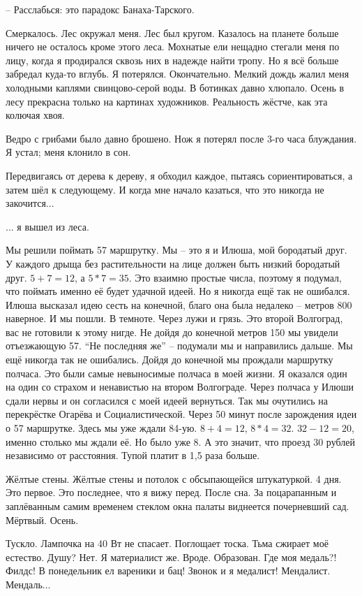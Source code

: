 -- Расслабься: это парадокс Банаха-Тарского.

\asterisks
Смеркалось. Лес окружал меня. Лес был кругом. Казалось на планете больше ничего не осталось кроме этого леса. Мохнатые ели нещадно стегали меня по лицу, когда я продирался сквозь них в надежде найти тропу. Но я всё больше забредал куда-то вглубь. Я потерялся. Окончательно. Мелкий дождь жалил меня холодными каплями свинцово-серой воды. В ботинках давно хлюпало. Осень в лесу прекрасна только на картинах художников. Реальность жёстче, как эта колючая хвоя.

Ведро с грибами было давно брошено. Нож я потерял после 3-го часа блуждания. Я устал; меня клонило в сон.

Передвигаясь от дерева к дереву, я обходил каждое, пытаясь сориентироваться, а затем шёл к следующему. И когда мне начало казаться, что это никогда не закочится...

... я вышел из леса.

\asterisks
Мы решили поймать 57 маршрутку. Мы -- это я и Илюша, мой бородатый друг. У каждого дрыща без растительности на лице должен быть низкий бородатый друг. \( 5+7=12 \), а \( 5*7=35 \). Это взаимно простые числа, поэтому я подумал, что поймать именно её будет удачной идеей. Но я никогда ещё так не ошибался. Илюша высказал идею сесть на конечной, благо она была недалеко -- метров 800 наверное. И мы пошли. В темноте. Через лужи и грязь. Это второй Волгоград, вас не готовили к этому нигде. Не дойдя до конечной метров 150 мы увидели отъезжающую 57. ``Не последняя же'' -- подумали мы и направились дальше. Мы ещё никогда так не ошибались. Дойдя до конечной мы прождали маршрутку полчаса. Это были самые невыносимые полчаса в моей жизни. Я оказался один на один со страхом и ненавистью на втором Волгограде. Через полчаса у Илюши сдали нервы и он согласился с моей идеей вернуться. Так мы очутились на перекрёстке Огарёва и Социалистической. Через 50 минут после зарождения идеи о 57 маршрутке. Здесь мы уже ждали 84-ую. \( 8 + 4 = 12 \), \( 8 * 4 = 32 \). \( 32 - 12 = 20 \), именно столько мы ждали её. Но было уже 8. А это значит, что проезд 30 рублей независимо от расстояния. Тупой платит в 1,5 раза больше.

\asterisks
Жёлтые стены. Жёлтые стены и потолок с обсыпающейся штукатуркой. 4 дня. Это первое. Это последнее, что я вижу перед. После сна. За поцарапанным и заплёванным самим временем стеклом окна палаты виднеется почерневший сад. Мёртвый. Осень.

Тускло. Лампочка на 40 Вт не спасает. Поглощает тоска. Тьма сжирает моё естество. Душу? Нет. Я материалист же. Вроде. Образован. Где моя медаль?! Филдс! В понедельник ел вареники и бац! Звонок и я медалист! Мендалист. Мендаль...

